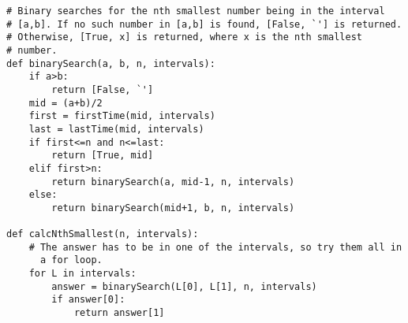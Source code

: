 \documentclass[11pt]{article}
\begin{document}
\begin{verbatim}
# Binary searches for the nth smallest number being in the interval
# [a,b]. If no such number in [a,b] is found, [False, `'] is returned.
# Otherwise, [True, x] is returned, where x is the nth smallest
# number. 
def binarySearch(a, b, n, intervals):
    if a>b:
        return [False, `']
    mid = (a+b)/2
    first = firstTime(mid, intervals)
    last = lastTime(mid, intervals)
    if first<=n and n<=last:
        return [True, mid]
    elif first>n:
        return binarySearch(a, mid-1, n, intervals)
    else:
        return binarySearch(mid+1, b, n, intervals)

def calcNthSmallest(n, intervals):
    # The answer has to be in one of the intervals, so try them all in
      a for loop.
    for L in intervals:
        answer = binarySearch(L[0], L[1], n, intervals)
        if answer[0]:
            return answer[1]
\end{verbatim}
\end{document}
